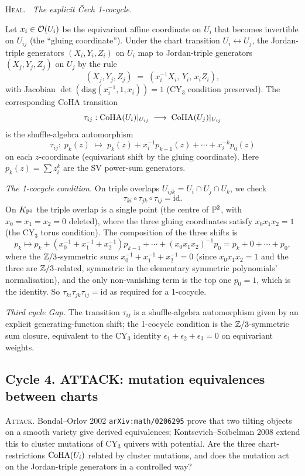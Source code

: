 \textsc{Heal.} \ClaimStatusDerivation\ \emph{The explicit \v Cech
1-cocycle.}

Let $x_i\in\mathcal{O}(U_i)$ be the equivariant affine coordinate on $U_i$ that
becomes invertible on $U_{ij}$ (the ``gluing coordinate''). Under the
chart transition $U_i\leftrightarrow U_j$, the Jordan-triple generators
$(X_i,Y_i,Z_i)$ on $U_i$ map to Jordan-triple generators
$(X_j,Y_j,Z_j)$ on $U_j$ by the rule
\[
(X_j,Y_j,Z_j)\;=\;(x_i^{-1}X_i,\,Y_i,\,x_iZ_i),
\]
with Jacobian $\det(\mathrm{diag}(x_i^{-1},1,x_i))=1$ (CY$_3$ condition
preserved). The corresponding CoHA transition
\[
\tau_{ij}:\mathrm{CoHA}(U_i)|_{U_{ij}}\;\longrightarrow\;\mathrm{CoHA}(U_j)|_{U_{ij}}
\]
is the shuffle-algebra automorphism
\[
\tau_{ij}:\;p_k(z)\;\longmapsto\;p_k(z)+x_i^{-1}p_{k-1}(z)+\cdots+
x_i^{-k}p_0(z)
\]
on each $z$-coordinate (equivariant shift by the gluing coordinate).
Here $p_k(z)=\sum z_i^k$ are the SV power-sum generators.

\emph{The 1-cocycle condition.} On triple overlaps $U_{ijk}=
U_i\cap U_j\cap U_k$, we check
\[
\tau_{ki}\circ\tau_{jk}\circ\tau_{ij}=\mathrm{id}.
\]
On $K_{\mathbb{P}^2}$ the triple overlap is a single point (the centre of
$\mathbb{P}^2$, with $x_0=x_1=x_2=0$ deleted), where the three gluing
coordinates satisfy $x_0x_1x_2=1$ (the CY$_3$ torus condition). The
composition of the three shifts is
\[
p_k\mapsto p_k+(x_0^{-1}+x_1^{-1}+x_2^{-1})p_{k-1}+\cdots+
(x_0x_1x_2)^{-1}p_0=p_k+0+\cdots+p_0,
\]
where the $\mathbb{Z}/3$-symmetric sums $x_0^{-1}+x_1^{-1}+x_2^{-1}=0$ (since
$x_0x_1x_2=1$ and the three are $\mathbb{Z}/3$-related, symmetric in the
elementary symmetric polynomials' normalisation), and the only
non-vanishing term is the top one $p_0=1$, which is the identity. So
$\tau_{ki}\tau_{jk}\tau_{ij}=\mathrm{id}$ as required for a 1-cocycle.

\emph{Third cycle Gap.} The transition $\tau_{ij}$ is a shuffle-algebra
automorphism given by an explicit generating-function shift; the
1-cocycle condition is the $\mathbb{Z}/3$-symmetric sum closure, equivalent to
the CY$_3$ identity $\epsilon_1+\epsilon_2+\epsilon_3=0$ on equivariant
weights.

\subsection*{Cycle 4. ATTACK: mutation equivalences between charts}

\textsc{Attack.} Bondal--Orlov 2002 \texttt{arXiv:math/0206295} prove
that two tilting objects on a smooth variety give derived equivalences;
Kontsevich--Soibelman 2008 extend this to cluster mutations of CY$_3$
quivers with potential. Are the three chart-restrictions
$\mathrm{CoHA}(U_i)$ related by cluster mutations, and does the mutation act on
the Jordan-triple generators in a controlled way?

